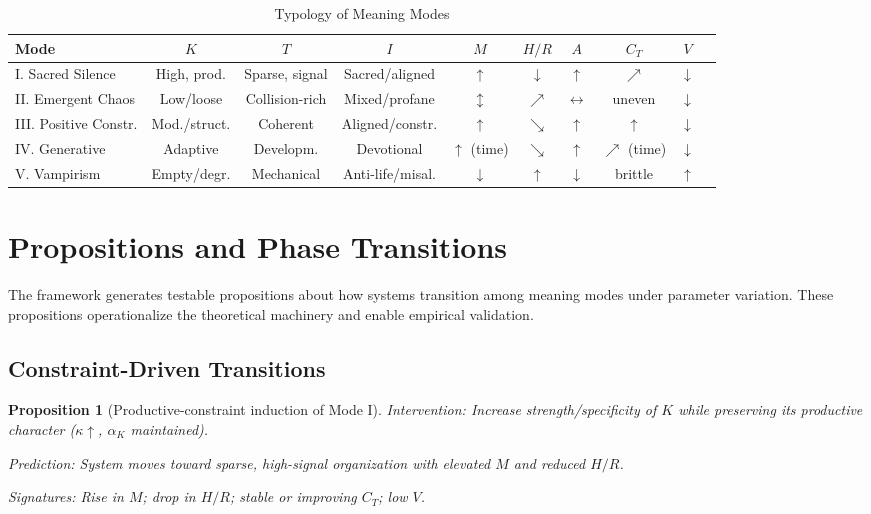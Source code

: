 \documentclass[12pt]{article}
\newtheorem{proposition}{Proposition}
\begin{document}
\begin{table}[h]
\centering
\caption{Typology of Meaning Modes}
\label{tab:modes}
\begin{tabular}{@{}lccccccccc@{}}
\hline
\textbf{Mode} & \textbf{$K$} & \textbf{$T$} & \textbf{$I$} & \textbf{$M$} & \textbf{$H/R$} & \textbf{$A$} & \textbf{$C_T$} & \textbf{$V$} \\
\hline
I. Sacred Silence & High, prod. & Sparse, signal & Sacred/aligned & $\uparrow$ & $\downarrow$ & $\uparrow$ & $\nearrow$ & $\downarrow$ \\
II. Emergent Chaos & Low/loose & Collision-rich & Mixed/profane & $\updownarrow$ & $\nearrow$ & $\leftrightarrow$ & uneven & $\downarrow$ \\
III. Positive Constr. & Mod./struct. & Coherent & Aligned/constr. & $\uparrow$ & $\searrow$ & $\uparrow$ & $\uparrow$ & $\downarrow$ \\
IV. Generative & Adaptive & Developm. & Devotional & $\uparrow$ (time) & $\searrow$ & $\uparrow$ & $\nearrow$ (time) & $\downarrow$ \\
V. Vampirism & Empty/degr. & Mechanical & Anti-life/misal. & $\downarrow$ & $\uparrow$ & $\downarrow$ & brittle & $\uparrow$ \\
\hline
\end{tabular}
\end{table}

\section{Propositions and Phase Transitions}
\label{sec:propositions}

The framework generates testable propositions about how systems transition among meaning modes under parameter variation. These propositions operationalize the theoretical machinery and enable empirical validation.

\subsection{Constraint-Driven Transitions}

\begin{proposition}[Productive-constraint induction of Mode I]
\label{prop:p1}
Intervention: Increase strength/specificity of $K$ while preserving its productive character ($\kappa \uparrow$, $\alpha_K$ maintained).

Prediction: System moves toward sparse, high-signal organization with elevated $M$ and reduced $H/R$.

Signatures: Rise in $M$; drop in $H/R$; stable or improving $C_T$; low $V$.
\end{proposition}
\end{document}
